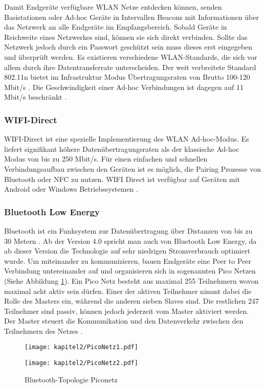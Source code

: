 Damit Endgeräte verfügbare \ac{WLAN} Netze entdecken können, senden Basistationen oder Ad-hoc Geräte in Intervallen Beacons mit Informationen über das Netzwerk an alle Endgeräte im Empfangsbereich. Sobald Geräte in Reichweite eines Netzwerkes sind, können sie sich direkt verbinden. Sollte das Netzwerk jedoch durch ein Passwort geschützt sein muss dieses erst eingegeben und überprüft werden.
 Es existieren verschiedene \ac{WLAN}-Standards, die sich vor allem durch ihre Datentransferrate unterscheiden. Der weit verbreitete Standard 802.11n bietet im Infrastruktur Modus Übertragungsraten von Brutto 100-120 Mbit/s \cite[46-55]{baun2012computernetze}. Die Geschwindigkeit einer Ad-hoc Verbindungen ist dagegen auf 11 Mbit/s beschränkt \cite{wirtz2011establishing}.

\subsubsection{WIFI-Direct}
WIFI-Direct ist eine spezielle Implementierung des \ac{WLAN} Ad-hoc-Modus. Es liefert signifikant höhere Datenübertragungsraten als der klassische Ad-hoc Modus von bis zu 250 Mbit/s. Für einen einfachen und schnellen Verbindungsaufbau zwischen den Geräten ist es möglich, die Pairing Prozesse von Bluetooth oder \ac{NFC} zu nutzen. WIFI Direct ist verfügbar auf Geräten mit Android oder Windows Betriebssystemen \cite{wiki:WIFI-Direct}.

\subsubsection{Bluetooth Low Energy}
Bluetooth ist ein Funksystem zur Datenübertragung über Distanzen von bis zu 30 Metern \cite{agrawal2012near}. Ab der Version 4.0 spricht man auch von Bluetooth Low Energy, da ab dieser Version die Technologie auf sehr niedrigen Stromverbrauch optimiert wurde. Um miteinander zu kommunizieren, bauen Endgeräte eine Peer to Peer Verbindung untereinander auf und organisieren sich in sogenannten Pico Netzen (Siehe Abbildung \ref{fig:pico1}). Ein Pico Netz besteht aus maximal 255 Teilnehmern wovon maximal acht aktiv sein dürfen. Einer der aktiven Teilnehmer nimmt dabei die Rolle des Masters ein, während die anderen sieben Slaves sind. Die restlichen 247 Teilnehmer sind passiv, können jedoch jederzeit vom Master aktiviert werden. Der Master steuert die Kommunikation und den Datenverkehr zwischen den Teilnehmern des Netzes \cite[55-57]{baun2012computernetze}. 

\begin{figure}[H]
\begin{minipage}[hbt]{7cm}
  \centering
  \texttt{[image: kapitel2/PicoNetz1.pdf]}
\end{minipage}
\hfill
\begin{minipage}[hbt]{7cm}
  \centering
  \texttt{[image: kapitel2/PicoNetz2.pdf]}
\end{minipage}
\caption{Bluetooth-Topologie Piconetz \cite[vgl. Abb. 5.4]{baun2012computernetze}}
\label{fig:pico1}
\end{figure}

